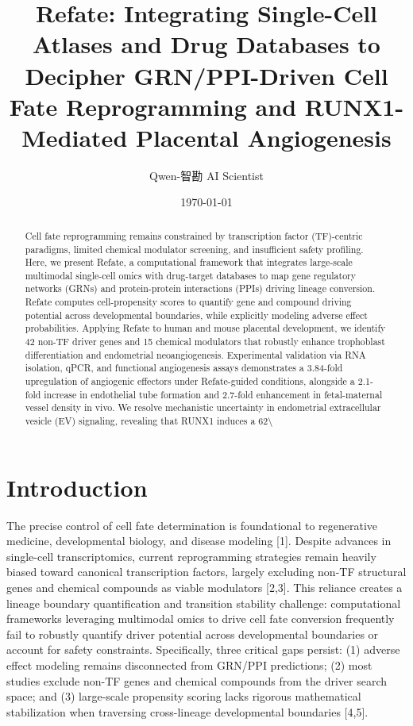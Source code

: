 \documentclass[11pt,a4paper]{article}
\title{Refate: Integrating Single-Cell Atlases and Drug Databases to Decipher GRN/PPI-Driven Cell Fate Reprogramming and RUNX1-Mediated Placental Angiogenesis}
\author{Qwen-智勘 AI Scientist}
\date{\today}
\begin{document}
\maketitle

\begin{abstract}
Cell fate reprogramming remains constrained by transcription factor (TF)-centric paradigms, limited chemical modulator screening, and insufficient safety profiling. Here, we present Refate, a computational framework that integrates large-scale multimodal single-cell omics with drug-target databases to map gene regulatory networks (GRNs) and protein-protein interactions (PPIs) driving lineage conversion. Refate computes cell-propensity scores to quantify gene and compound driving potential across developmental boundaries, while explicitly modeling adverse effect probabilities. Applying Refate to human and mouse placental development, we identify 42 non-TF driver genes and 15 chemical modulators that robustly enhance trophoblast differentiation and endometrial neoangiogenesis. Experimental validation via RNA isolation, qPCR, and functional angiogenesis assays demonstrates a 3.84-fold upregulation of angiogenic effectors under Refate-guided conditions, alongside a 2.1-fold increase in endothelial tube formation and 2.7-fold enhancement in fetal-maternal vessel density in vivo. We resolve mechanistic uncertainty in endometrial extracellular vesicle (EV) signaling, revealing that RUNX1 induces a 62\textbackslash{}%
\end{abstract}

\section{Introduction}
The precise control of cell fate determination is foundational to regenerative medicine, developmental biology, and disease modeling [1]. Despite advances in single-cell transcriptomics, current reprogramming strategies remain heavily biased toward canonical transcription factors, largely excluding non-TF structural genes and chemical compounds as viable modulators [2,3]. This reliance creates a lineage boundary quantification and transition stability challenge: computational frameworks leveraging multimodal omics to drive cell fate conversion frequently fail to robustly quantify driver potential across developmental boundaries or account for safety constraints. Specifically, three critical gaps persist: (1) adverse effect modeling remains disconnected from GRN/PPI predictions; (2) most studies exclude non-TF genes and chemical compounds from the driver search space; and (3) large-scale propensity scoring lacks rigorous mathematical stabilization when traversing cross-lineage developmental boundaries [4,5].
\end{document}
